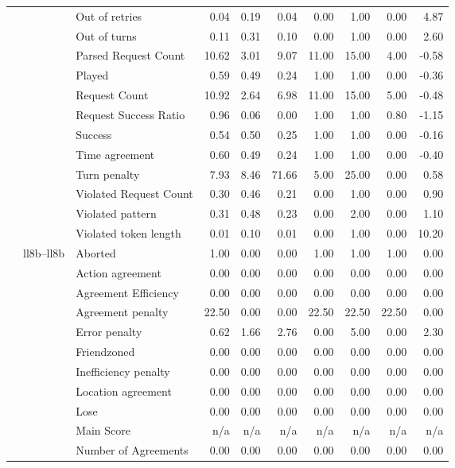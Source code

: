 \begin{tabular}{lllrrrrrrr}
 &  & Out of retries & 0.04 & 0.19 & 0.04 & 0.00 & 1.00 & 0.00 & 4.87 \\
 &  & Out of turns & 0.11 & 0.31 & 0.10 & 0.00 & 1.00 & 0.00 & 2.60 \\
 &  & Parsed Request Count & 10.62 & 3.01 & 9.07 & 11.00 & 15.00 & 4.00 & -0.58 \\
 &  & Played & 0.59 & 0.49 & 0.24 & 1.00 & 1.00 & 0.00 & -0.36 \\
 &  & Request Count & 10.92 & 2.64 & 6.98 & 11.00 & 15.00 & 5.00 & -0.48 \\
 &  & Request Success Ratio & 0.96 & 0.06 & 0.00 & 1.00 & 1.00 & 0.80 & -1.15 \\
 &  & Success & 0.54 & 0.50 & 0.25 & 1.00 & 1.00 & 0.00 & -0.16 \\
 &  & Time agreement & 0.60 & 0.49 & 0.24 & 1.00 & 1.00 & 0.00 & -0.40 \\
 &  & Turn penalty & 7.93 & 8.46 & 71.66 & 5.00 & 25.00 & 0.00 & 0.58 \\
 &  & Violated Request Count & 0.30 & 0.46 & 0.21 & 0.00 & 1.00 & 0.00 & 0.90 \\
 &  & Violated pattern & 0.31 & 0.48 & 0.23 & 0.00 & 2.00 & 0.00 & 1.10 \\
 &  & Violated token length & 0.01 & 0.10 & 0.01 & 0.00 & 1.00 & 0.00 & 10.20 \\
\cline{2-10}
 & \multirow[t]{27}{*}{ll8b--ll8b} & Aborted & 1.00 & 0.00 & 0.00 & 1.00 & 1.00 & 1.00 & 0.00 \\
 &  & Action agreement & 0.00 & 0.00 & 0.00 & 0.00 & 0.00 & 0.00 & 0.00 \\
 &  & Agreement Efficiency & 0.00 & 0.00 & 0.00 & 0.00 & 0.00 & 0.00 & 0.00 \\
 &  & Agreement penalty & 22.50 & 0.00 & 0.00 & 22.50 & 22.50 & 22.50 & 0.00 \\
 &  & Error penalty & 0.62 & 1.66 & 2.76 & 0.00 & 5.00 & 0.00 & 2.30 \\
 &  & Friendzoned & 0.00 & 0.00 & 0.00 & 0.00 & 0.00 & 0.00 & 0.00 \\
 &  & Inefficiency penalty & 0.00 & 0.00 & 0.00 & 0.00 & 0.00 & 0.00 & 0.00 \\
 &  & Location agreement & 0.00 & 0.00 & 0.00 & 0.00 & 0.00 & 0.00 & 0.00 \\
 &  & Lose & 0.00 & 0.00 & 0.00 & 0.00 & 0.00 & 0.00 & 0.00 \\
 &  & Main Score & n/a & n/a & n/a & n/a & n/a & n/a & n/a \\
 &  & Number of Agreements & 0.00 & 0.00 & 0.00 & 0.00 & 0.00 & 0.00 & 0.00 \\

\end{tabular}
